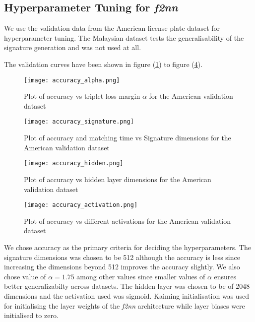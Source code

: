 \documentclass[10pt,twocolumn,letterpaper]{article}
\begin{document}
    \subsection{Hyperparameter Tuning for \emph{f2nn} \label{sec:expt:hyperparam}}
    We use the validation data from the American license plate dataset for hyperparameter tuning. The Malaysian dataset tests the generalisability of the signature generation and was not used at all.
    
    The validation curves have been shown in figure (\ref{fig:acc_alpha}) to figure (\ref{fig:acc_act}).
        \begin{figure}[!ht]
        \begin{center}
            \texttt{[image: accuracy\_alpha.png]}
            \caption{Plot of accuracy vs triplet loss margin $\alpha$ for the American validation dataset}
            \label{fig:acc_alpha}
        \end{center}
        \end{figure}
        \begin{figure}[!ht]
        \begin{center}
            \texttt{[image: accuracy\_signature.png]}
            \caption{Plot of accuracy and matching time vs Signature dimensions for the American validation dataset}
            \label{fig:acc_sig}
        \end{center}
        \end{figure}
        \begin{figure}[!ht]
        \begin{center}
            \texttt{[image: accuracy\_hidden.png]}
            \caption{Plot of accuracy vs hidden layer dimensions for the American validation dataset}
            \label{fig:acc_hid}
        \end{center}
        \end{figure}
        \begin{figure}[!ht]
        \begin{center}
            \texttt{[image: accuracy\_activation.png]}
            \caption{Plot of accuracy vs different activations for the American validation dataset}
            \label{fig:acc_act}
        \end{center}
        \end{figure}
        
    We chose accuracy as the primary criteria for deciding the hyperparameters. The signature dimensions was chosen to be 512 although the accuracy is less since increasing the dimensions beyond 512 improves the accuracy slightly. We also chose value of $\alpha=1.75$ among other values since smaller values of $\alpha$ ensures better generalizabilty across datasets. The hidden layer was chosen to be of 2048 dimensions and the activation used was sigmoid. Kaiming initialisation
    \cite{he2015delving} was used for initialising the layer weights of the \emph{f2nn} architecture while layer biases were initialised to zero.
    
\end{document}
